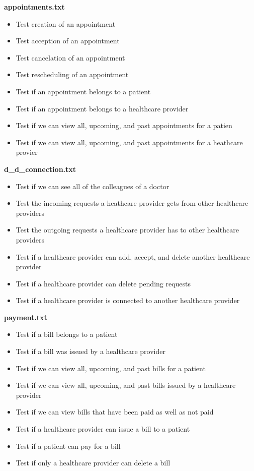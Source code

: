 \documentclass[12pt]{report}
\begin{document}
\begin{itemize}
\textbf{appointments.txt}
\begin{itemize}
\item Test creation of an appointment
\item Test acception of an appointment
\item Test cancelation of an appointment
\item Test rescheduling of an appointment
\item Test if an appointment belongs to a patient
\item Test if an appointment belongs to a healthcare provider
\item Test if we can view all, upcoming, and past appointments for a patien
\item Test if we can view all, upcoming, and past appointments for a heathcare provier
\end{itemize}

\textbf{d\_d\_connection.txt}
\begin{itemize}
\item Test if we can see all of the colleagues of a doctor
\item Test the incoming requests a heathcare provider gets from other healthcare providers
\item Test the outgoing requests a healthcare provider has to other healthcare providers
\item Test if a healthcare provider can add, accept, and delete another healthcare provider
\item Test if a healthcare provider can delete pending requests
\item Test if a healthcare provider is connected to another healthcare provider
\end{itemize}

\textbf{payment.txt}
\begin{itemize}
\item Test if a bill belongs to a patient
\item Test if a bill was issued by a healthcare provider
\item Test if we can view all, upcoming, and past bills for a patient
\item Test if we can view all, upcoming, and past bills issued by a healthcare provider
\item Test if we can view bills that have been paid as well as not paid
\item Test if a healthcare provider can issue a bill to a patient
\item Test if a patient can pay for a bill
\item Test if only a healthcare provider can delete a bill
\end{itemize}



\end{itemize}
\end{document}
